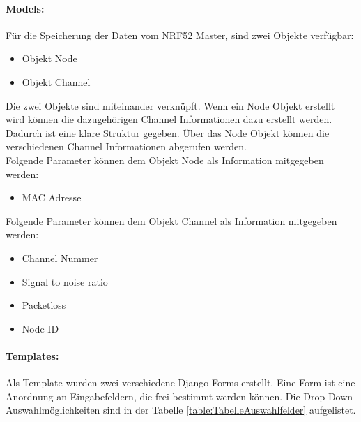 \newpage
\paragraph{Models: }\label{par:2Models}
Für die Speicherung der Daten vom NRF52 Master, sind zwei Objekte verfügbar: 
\begin{itemize}
	\item Objekt Node
	\item Objekt Channel
\end{itemize} 

\vspace{3mm}
Die zwei Objekte sind miteinander verknüpft. Wenn ein Node Objekt erstellt wird können die dazugehörigen Channel Informationen dazu erstellt werden. Dadurch ist eine klare Struktur gegeben. Über das Node Objekt können die verschiedenen Channel Informationen abgerufen werden. \\


Folgende Parameter können dem Objekt Node als Information mitgegeben werden:
\begin{itemize}
	\item MAC Adresse
\end{itemize} 

\vspace{3mm}
Folgende Parameter können dem Objekt Channel als Information mitgegeben werden:
\begin{itemize}
	\item Channel Nummer
	\item Signal to noise ratio
	\item Packetloss
	\item Node ID
\end{itemize}

\vspace{5mm}
\paragraph{Templates: }\label{par:2Templates}
Als Template wurden zwei verschiedene Django Forms erstellt. Eine Form ist eine Anordnung an Eingabefeldern, die frei bestimmt werden können. Die Drop Down Auswahlmöglichkeiten sind in der Tabelle \ref{table:TabelleAuswahlfelder} aufgelistet. \\

